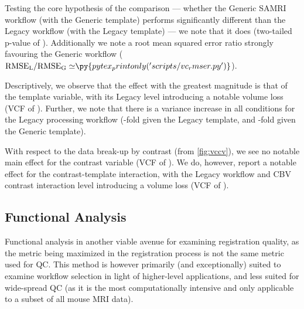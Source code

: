 Testing the core hypothesis of the comparison ---
whether the Generic SAMRI workflow (with the Generic template) performs significantly different than the Legacy workflow (with the Legacy template) ---
we note that it does
(two-tailed p-value of ).
Additionally we note a root mean squared error ratio strongly favouring the Generic workflow
($\mathrm{RMSE_{L}/RMSE_{G}\simeq} \py{pytex_printonly('scripts/vc_rmser.py')}$).

Descriptively, we observe that the effect with the greatest magnitude is that of the template variable, with its Legacy level introducing a notable volume loss
(VCF of ).
Further, we note that there is a variance increase in all conditions for the Legacy processing workflow
(-fold given the Legacy template, and -fold given the Generic template).

With respect to the data break-up by contrast (from \cref{fig:vccv}), we see no notable main effect for the contrast variable
(VCF of ).
We do, however, report a notable effect for the contrast-template interaction, with the Legacy workflow and CBV contrast interaction level introducing a volume loss
(VCF of ).

\subsection{Functional Analysis}

Functional analysis in another viable avenue for examining registration quality, as the metric being maximized in the registration process is not the same metric used for QC.
This method is however primarily (and exceptionally) suited to examine workflow selection in light of higher-level applications, and less suited for wide-spread QC (as it is the most computationally intensive and only applicable to a subset of all mouse MRI data).

\begin{sansmath}
\end{sansmath}

